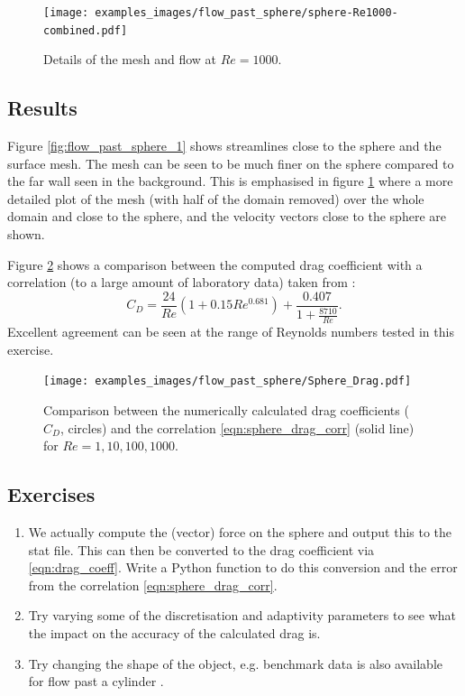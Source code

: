\begin{figure}
\centering
\texttt{[image: examples\_images/flow\_past\_sphere/sphere-Re1000-combined.pdf]}
\caption{Details of the mesh and flow at $Re=1000$.}
\label{fig:flow_past_sphere_2}
\end{figure}

\subsection{Results}
Figure \ref{fig:flow_past_sphere_1} shows streamlines close to the sphere and the surface mesh.
The mesh can be seen to be much finer on the sphere compared to the far wall seen in the background.
This is emphasised in figure \ref{fig:flow_past_sphere_2} where a more detailed plot of the mesh (with
half of the domain removed) over the whole domain and close to the sphere, and the velocity vectors
close to the sphere are shown.

Figure \ref{fig:flow_past_sphere_3} shows a comparison between the computed drag coefficient with
a correlation (to a large amount of laboratory data) taken from \citet{brown2003}:
\begin{equation}
C_D = \frac{24}{Re}\left(1+0.15Re^{0.681}\right) + \frac{0.407}{1+\frac{8710}{Re}}.
\label{eqn:sphere_drag_corr}
\end{equation}
Excellent agreement can be seen at the range of Reynolds numbers tested in this exercise.


\begin{figure}
\centering
\texttt{[image: examples\_images/flow\_past\_sphere/Sphere\_Drag.pdf]}
\caption{Comparison between the numerically calculated drag coefficients ($C_D$, circles) and the correlation \eqref{eqn:sphere_drag_corr} (solid line)
for $Re=1,10,100,1000$.}
\label{fig:flow_past_sphere_3}
\end{figure}



\subsection{Exercises}
\begin{enumerate}
\item We actually compute the (vector) force on the sphere and output this to the stat file. This can then be converted to the drag coefficient 
via \eqref{eqn:drag_coeff}. Write a Python function to do this conversion and the error from the correlation \eqref{eqn:sphere_drag_corr}.
\item Try varying some of the discretisation and adaptivity parameters to see what the impact on the accuracy of the
calculated drag is.
\item Try changing the shape of the object, e.g. benchmark data is also available for flow past a cylinder \citep{schafer1996}.
\end{enumerate}



